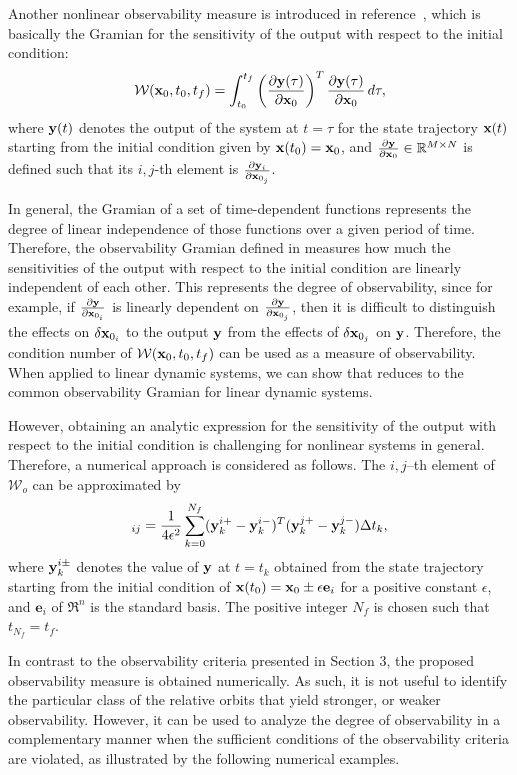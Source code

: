 Another nonlinear observability measure is introduced in reference~\cite{KreIdePICDC09}, which is basically the Gramian for the sensitivity of the output with respect to the initial condition:
\begin{align}
\mathcal{W} (\mathbf{x}_0,t_0,t_f) = \int_{t_0}^{t_f} \left( \frac{\partial \mathbf{y}(\tau)}{\partial \mathbf{x}_0} \right)^T\frac{\partial \mathbf{y}(\tau)}{\partial \mathbf{x}_0}\,d\tau,\label{eqn:Wo_NL}
\end{align}
where $\mathbf{y}(t)$ denotes the output of the system at $t=\tau$ for the state trajectory $\mathbf{x}(t)$ starting from the initial condition given by $\mathbf{x}(t_0)=\mathbf{x}_0$, and $\frac{\partial \mathbf{y}}{\partial \mathbf{x}_0}\in\mathbb{R}^{M\times N}$ is defined such that its $i,j$-th element is $\frac{\partial \mathbf{y}_i}{\partial \mathbf{x}_{0_j}}$. 

In general, the Gramian of a set of time-dependent functions represents the degree of linear independence of those functions over a given period of time. Therefore, the observability Gramian defined in  measures how much the sensitivities of the output with respect to the initial condition are linearly independent of each other. This represents the degree of observability, since for example, if $\frac{\partial \mathbf{y}}{\partial \mathbf{x}_{0_i}}$ is linearly dependent on $\frac{\partial \mathbf{y}}{\partial \mathbf{x}_{0_j}}$, then it is difficult to distinguish the effects on $\delta \mathbf{x}_{0_i}$ to the output $\mathbf{y}$ from the effects of $\delta \mathbf{x}_{0_j}$ on $\mathbf{y}$. Therefore, the condition number of $\mathcal{W} (\mathbf{x}_0,t_0,t_f)$ can be used as a measure of observability. When applied to linear dynamic systems, we can show that  reduces to the common observability Gramian for linear dynamic systems.

However, obtaining an analytic expression for the sensitivity of the output with respect to the initial condition is challenging for nonlinear systems in general. Therefore, a numerical approach is considered as follows. The $i,j$--th element of $\mathcal{W}_o$ can be approximated by
\begin{align}
[\mathcal{W}]_{ij} = \frac{1}{4\epsilon^2}\sum_{k=0}^{N_f} (\y^{i+}_k-\y^{i-}_k)^T(\y^{j+}_k-\y^{j-}_k) \Delta t_k,
\end{align}
where $\mathbf{y}^{i\pm}_k$ denotes the value of $\mathbf{y}$ at $t=t_k$ obtained from the state trajectory starting from the initial condition of $\mathbf{x}(t_0)=\mathbf{x}_0\pm \epsilon \mathbf{e}_i $ for a positive constant $\epsilon$, and $\mathbf{e}_i$ of $\Re^n$ is the standard basis. The positive integer $N_f$ is chosen such that $t_{N_f}=t_f$. 

In contrast to the observability criteria presented in Section 3, the proposed observability measure is obtained numerically. As such, it is not useful to identify the particular class of the relative orbits that yield stronger, or weaker observability. However, it can be used to analyze the degree of observability in a complementary manner when the sufficient conditions of the observability criteria are violated, as illustrated by the following numerical examples.  




